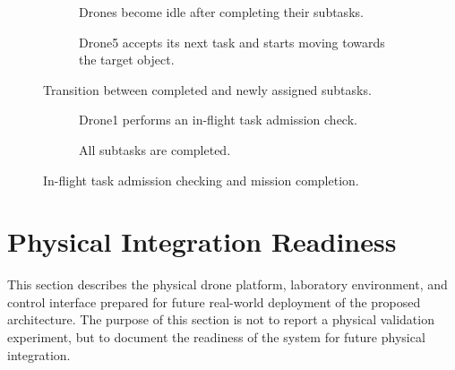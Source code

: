 \begin{landscape}
\begin{figure}[p]
    \centering

    \begin{subfigure}{0.49\linewidth}
        \centering
        \caption{Drones become idle after completing their subtasks.}
        \label{fig:frame_5}
    \end{subfigure}
    \hfill
    \begin{subfigure}{0.49\linewidth}
        \centering
        \caption{Drone5 accepts its next task and starts moving towards the target object.}
        \label{fig:frame_6}
    \end{subfigure}

    \caption{Transition between completed and newly assigned subtasks.}
    \label{fig:sim_execution_frames_3}
\end{figure}
\end{landscape}

\begin{landscape}
\begin{figure}[p]
    \centering

    \begin{subfigure}{0.49\linewidth}
        \centering
        \caption{Drone1 performs an in-flight task admission check.}
        \label{fig:frame_7}
    \end{subfigure}
    \hfill
    \begin{subfigure}{0.49\linewidth}
        \centering
        \caption{All subtasks are completed.}
        \label{fig:frame_8}
    \end{subfigure}

    \caption{In-flight task admission checking and mission completion.}
    \label{fig:sim_execution_frames_4}
\end{figure}
\end{landscape}

\section{Physical Integration Readiness}

This section describes the physical drone platform, laboratory environment, and control
interface prepared for future real-world deployment of the proposed architecture. The purpose
of this section is not to report a physical validation experiment, but to document the readiness
of the system for future physical integration.

